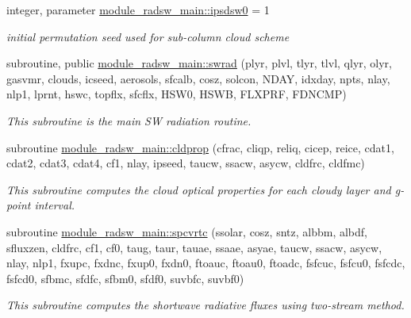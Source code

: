 \begin{DoxyCompactItemize}
\mbox{\label{group__module__radsw__main_gae1f88a0b60d69b892cfae83bb9ab67df}} 
integer, parameter \hyperlink{group__module__radsw__main_gae1f88a0b60d69b892cfae83bb9ab67df}{module\+\_\+radsw\+\_\+main\+::ipsdsw0} = 1
\begin{DoxyCompactList}\small\item\em initial permutation seed used for sub-\/column cloud scheme \end{DoxyCompactList}\item 
subroutine, public \hyperlink{group__module__radsw__main_ga784397878835a8cdd0b14a7b9eafb4e3}{module\+\_\+radsw\+\_\+main\+::swrad} (plyr, plvl, tlyr, tlvl, qlyr, olyr, gasvmr, clouds, icseed, aerosols, sfcalb, cosz, solcon, N\+D\+AY, idxday, npts, nlay, nlp1, lprnt, hswc, topflx, sfcflx, H\+S\+W0, H\+S\+WB, F\+L\+X\+P\+RF, F\+D\+N\+C\+MP)
\begin{DoxyCompactList}\small\item\em This subroutine is the main SW radiation routine. \end{DoxyCompactList}\end{DoxyCompactItemize}
\begin{DoxyCompactItemize}
\item 
subroutine \hyperlink{group__module__radsw__main_ga89ca572fa54a63a21009caa0760d405b}{module\+\_\+radsw\+\_\+main\+::cldprop} (cfrac, cliqp, reliq, cicep, reice, cdat1, cdat2, cdat3, cdat4, cf1, nlay, ipseed, taucw, ssacw, asycw, cldfrc, cldfmc)
\begin{DoxyCompactList}\small\item\em This subroutine computes the cloud optical properties for each cloudy layer and g-\/point interval. \end{DoxyCompactList}\end{DoxyCompactItemize}
\begin{DoxyCompactItemize}
\item 
subroutine \hyperlink{group__module__radsw__main_gaeb992f35bdf7dbf9ea8709d7d91dedfd}{module\+\_\+radsw\+\_\+main\+::spcvrtc} (ssolar, cosz, sntz, albbm, albdf, sfluxzen, cldfrc, cf1, cf0, taug, taur, tauae, ssaae, asyae, taucw, ssacw, asycw, nlay, nlp1, fxupc, fxdnc, fxup0, fxdn0, ftoauc, ftoau0, ftoadc, fsfcuc, fsfcu0, fsfcdc, fsfcd0, sfbmc, sfdfc, sfbm0, sfdf0, suvbfc, suvbf0)
\begin{DoxyCompactList}\small\item\em This subroutine computes the shortwave radiative fluxes using two-\/stream method. \end{DoxyCompactList}\end{DoxyCompactItemize}
